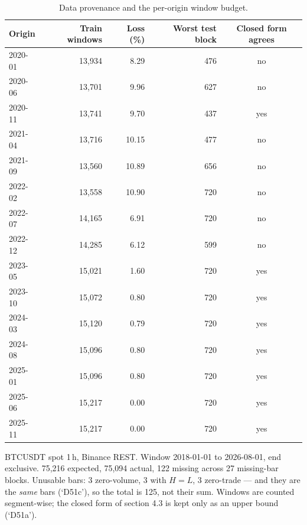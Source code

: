 \begin{table}[!t]
\centering
\caption{Data provenance and the per-origin window budget.}
\label{tab:dataset}
\begin{tabular}{lrrrc}
\toprule
Origin & Train windows & Loss (\%) & Worst test block & Closed form agrees \\
\midrule
2020-01 & 13,934 & 8.29 & 476 & no \\
2020-06 & 13,701 & 9.96 & 627 & no \\
2020-11 & 13,741 & 9.70 & 437 & yes \\
2021-04 & 13,716 & 10.15 & 477 & no \\
2021-09 & 13,560 & 10.89 & 656 & no \\
2022-02 & 13,558 & 10.90 & 720 & no \\
2022-07 & 14,165 & 6.91 & 720 & no \\
2022-12 & 14,285 & 6.12 & 599 & no \\
2023-05 & 15,021 & 1.60 & 720 & yes \\
2023-10 & 15,072 & 0.80 & 720 & yes \\
2024-03 & 15,120 & 0.79 & 720 & yes \\
2024-08 & 15,096 & 0.80 & 720 & yes \\
2025-01 & 15,096 & 0.80 & 720 & yes \\
2025-06 & 15,217 & 0.00 & 720 & yes \\
2025-11 & 15,217 & 0.00 & 720 & yes \\
\bottomrule
\end{tabular}
\vspace{2pt}\par\footnotesize BTCUSDT spot 1\,h, Binance REST. Window 2018-01-01 to 2026-08-01, end exclusive. 75,216 expected, 75,094 actual, 122 missing across 27 missing-bar blocks. Unusable bars: 3 zero-volume, 3 with $H=L$, 3 zero-trade --- and they are the \emph{same} bars (`D51c'), so the total is 125, not their sum. Windows are counted segment-wise; the closed form of section 4.3 is kept only as an upper bound (`D51a').
\end{table}
